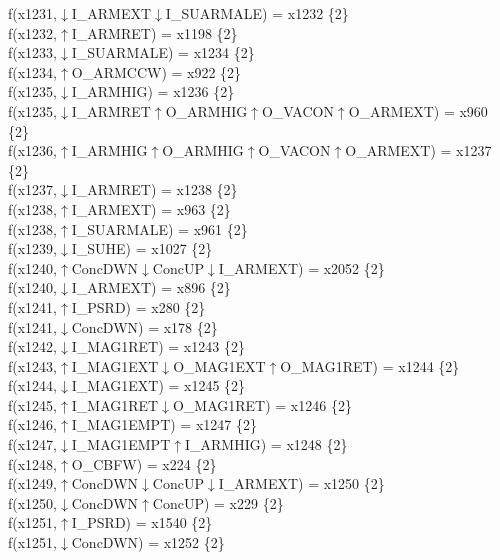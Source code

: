 f(x1231,$\downarrow$I\_ARMEXT$\downarrow$I\_SUARMALE) = x1232 \{2\} \\  
f(x1232,$\uparrow$I\_ARMRET) = x1198 \{2\} \\  
f(x1233,$\downarrow$I\_SUARMALE) = x1234 \{2\} \\  
f(x1234,$\uparrow$O\_ARMCCW) = x922 \{2\} \\  
f(x1235,$\downarrow$I\_ARMHIG) = x1236 \{2\} \\  
f(x1235,$\downarrow$I\_ARMRET$\uparrow$O\_ARMHIG$\uparrow$O\_VACON$\uparrow$O\_ARMEXT) = x960 \{2\} \\  
f(x1236,$\uparrow$I\_ARMHIG$\uparrow$O\_ARMHIG$\uparrow$O\_VACON$\uparrow$O\_ARMEXT) = x1237 \{2\} \\  
f(x1237,$\downarrow$I\_ARMRET) = x1238 \{2\} \\  
f(x1238,$\uparrow$I\_ARMEXT) = x963 \{2\} \\  
f(x1238,$\uparrow$I\_SUARMALE) = x961 \{2\} \\  
f(x1239,$\downarrow$I\_SUHE) = x1027 \{2\} \\  
f(x1240,$\uparrow$ConcDWN$\downarrow$ConcUP$\downarrow$I\_ARMEXT) = x2052 \{2\} \\  
f(x1240,$\downarrow$I\_ARMEXT) = x896 \{2\} \\  
f(x1241,$\uparrow$I\_PSRD) = x280 \{2\} \\  
f(x1241,$\downarrow$ConcDWN) = x178 \{2\} \\  
f(x1242,$\downarrow$I\_MAG1RET) = x1243 \{2\} \\  
f(x1243,$\uparrow$I\_MAG1EXT$\downarrow$O\_MAG1EXT$\uparrow$O\_MAG1RET) = x1244 \{2\} \\  
f(x1244,$\downarrow$I\_MAG1EXT) = x1245 \{2\} \\  
f(x1245,$\uparrow$I\_MAG1RET$\downarrow$O\_MAG1RET) = x1246 \{2\} \\  
f(x1246,$\uparrow$I\_MAG1EMPT) = x1247 \{2\} \\  
f(x1247,$\downarrow$I\_MAG1EMPT$\uparrow$I\_ARMHIG) = x1248 \{2\} \\  
f(x1248,$\uparrow$O\_CBFW) = x224 \{2\} \\  
f(x1249,$\uparrow$ConcDWN$\downarrow$ConcUP$\downarrow$I\_ARMEXT) = x1250 \{2\} \\  
f(x1250,$\downarrow$ConcDWN$\uparrow$ConcUP) = x229 \{2\} \\  
f(x1251,$\uparrow$I\_PSRD) = x1540 \{2\} \\  
f(x1251,$\downarrow$ConcDWN) = x1252 \{2\} \\  
